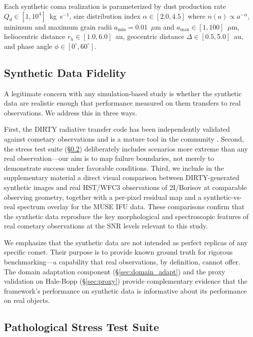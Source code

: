 \documentclass[usenatbib]{mnras}
\begin{document}
Each synthetic coma realization is parameterized by dust production rate $Q_d \in [1, 10^4]$~kg~s$^{-1}$, size distribution index $\alpha \in [2.0, 4.5]$ where $n(a) \propto a^{-\alpha}$, minimum and maximum grain radii $a_{\min} = 0.01$~$\mu$m and $a_{\max} \in [1, 100]$~$\mu$m, heliocentric distance $r_h \in [1.0, 6.0]$~au, geocentric distance $\Delta \in [0.5, 5.0]$~au, and phase angle $\phi \in [0^\circ, 60^\circ]$.

\subsection{Synthetic Data Fidelity}

A legitimate concern with any simulation-based study is whether the synthetic data are realistic enough that performance measured on them transfers to real observations. We address this in three ways.

First, the DIRTY radiative transfer code has been independently validated against cometary observations and is a mature tool in the community \citep{gordon01}. Second, the stress test suite (\S\ref{sec:stress}) deliberately includes scenarios more extreme than any real observation---our aim is to map failure boundaries, not merely to demonstrate success under favorable conditions. Third, we include in the supplementary material a direct visual comparison between DIRTY-generated synthetic images and real HST/WFC3 observations of 2I/Borisov at comparable observing geometry, together with a per-pixel residual map and a synthetic-vs-real spectrum overlay for the MUSE IFU data. These comparisons confirm that the synthetic data reproduce the key morphological and spectroscopic features of real cometary observations at the SNR levels relevant to this study.

We emphasize that the synthetic data are not intended as perfect replicas of any specific comet. Their purpose is to provide known ground truth for rigorous benchmarking---a capability that real observations, by definition, cannot offer. The domain adaptation component (\S\ref{sec:domain_adapt}) and the proxy validation on Hale-Bopp (\S\ref{sec:proxy}) provide complementary evidence that the framework's performance on synthetic data is informative about its performance on real objects.

\subsection{Pathological Stress Test Suite}\label{sec:stress}
\end{document}
